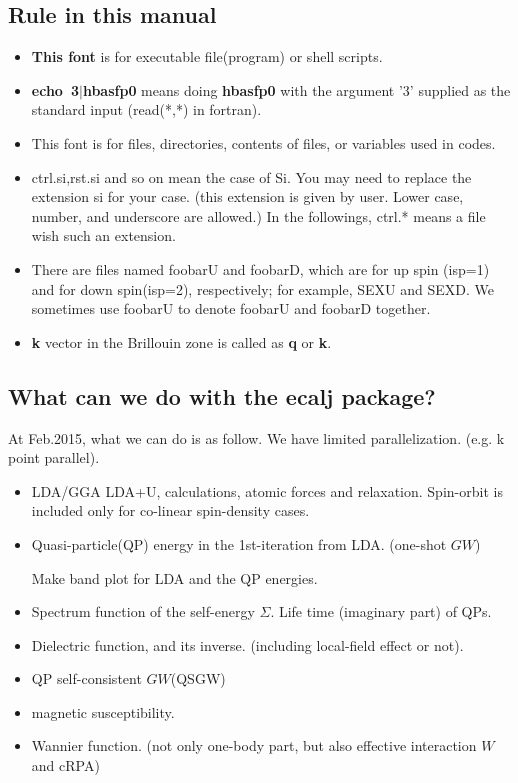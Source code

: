\documentclass[a4paper,10pt,epsf,fleqn]{article}
\newcommand{\GW}{$GW$}
\newcommand{\exe}[1]{{\bf #1}}
\newcommand{\io}[1]{{\sf  #1}}
\begin{document}
\subsection{Rule in this manual} 
\begin{itemize}
\item
\exe{This font} is for executable file(program) or shell scripts.
\item
\exe{echo~3$|$hbasfp0 } means doing \exe{hbasfp0} 
with the argument '3' supplied as the standard input (read(*,*) in fortran).
\item
\io{This font} is for files, 
directories, contents of files, or variables used in codes.
\item
\io{ctrl.si},\io{rst.si} and so on mean the case of Si. 
You may need to replace the extension \io{si} for your case.
(this extension is given by user. 
Lower case, number, and underscore \io{[a-z0-9\_]} are allowed.)
In the followings, \io{ctrl.*} means a file wish such an extension.
\item
 There are files named \io{foobarU} and \io{foobarD}, which are
 for up spin (isp=1) and for down spin(isp=2), respectively; 
 for example, \io{SEXU} and \io{SEXD}.
 We sometimes use \io{foobarU} to denote \io{foobarU} and \io{foobarD}
     together.
\item
 {\bf k} vector in the Brillouin zone is called as {\bf q} or {\bf k}.
\end{itemize}
\vspace{-5mm}


\subsection{What can we do with the \io{ecalj} package?}

At Feb.2015, what we can do is as follow. We have limited parallelization.
(e.g. k point parallel).

\begin{itemize}
\item LDA/GGA LDA+U, calculations, atomic forces and relaxation.
Spin-orbit is included only for co-linear spin-density cases.

\item 
Quasi-particle(QP) energy in the 1st-iteration from LDA.
(one-shot \GW)

Make band plot for LDA and the QP energies.

\item
Spectrum function of the self-energy $\Sigma$.
Life time (imaginary part) of QPs.

\item
Dielectric function, and its inverse.
(including local-field effect or not).

\item
QP self-consistent \GW (QSGW)

\item
magnetic susceptibility.

\item
Wannier function. (not only one-body part, but also effective
     interaction $W$ and cRPA)
\end{itemize}
\end{document}
